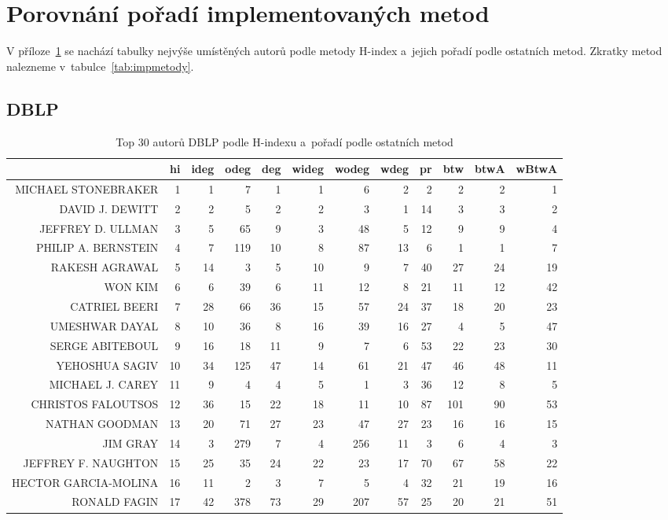 \documentclass{bakalarka}
\begin{document}
\newpage
\chapter{Porovnání pořadí implementovaných metod}
\label{chapter:porovnani}
V příloze~\ref{chapter:porovnani} se nachází tabulky nejvýše umístěných autorů
podle metody H-index a~jejich pořadí podle ostatních metod. Zkratky metod
nalezneme v~tabulce~\ref{tab:impmetody}.
\section{DBLP}

\begin{table}[!ht]
\centering
\caption{Top 30 autorů DBLP podle H-indexu a~pořadí podle ostatních metod}
\label{tab:ranks1}
\begin{sideways}
\begin{scriptsize}
\begin{tabular}{r|r|rrrrrrrrrr}
\toprule
&hi&ideg&odeg&deg&wideg&wodeg&wdeg&pr&btw&btwA&wBtwA\\
\midrule
MICHAEL STONEBRAKER&1&1&7&1&1&6&2&2&2&2&1\\
DAVID J. DEWITT&2&2&5&2&2&3&1&14&3&3&2\\
JEFFREY D. ULLMAN&3&5&65&9&3&48&5&12&9&9&4\\
PHILIP A. BERNSTEIN&4&7&119&10&8&87&13&6&1&1&7\\
RAKESH AGRAWAL&5&14&3&5&10&9&7&40&27&24&19\\
WON KIM&6&6&39&6&11&12&8&21&11&12&42\\
CATRIEL BEERI&7&28&66&36&15&57&24&37&18&20&23\\
UMESHWAR DAYAL&8&10&36&8&16&39&16&27&4&5&47\\
SERGE ABITEBOUL&9&16&18&11&9&7&6&53&22&23&30\\
YEHOSHUA SAGIV&10&34&125&47&14&61&21&47&46&48&11\\
MICHAEL J. CAREY&11&9&4&4&5&1&3&36&12&8&5\\
CHRISTOS FALOUTSOS&12&36&15&22&18&11&10&87&101&90&53\\
NATHAN GOODMAN&13&20&71&27&23&47&27&23&16&16&15\\
JIM GRAY&14&3&279&7&4&256&11&3&6&4&3\\
JEFFREY F. NAUGHTON&15&25&35&24&22&23&17&70&67&58&22\\
HECTOR GARCIA-MOLINA&16&11&2&3&7&5&4&32&21&19&16\\
RONALD FAGIN&17&42&378&73&29&207&57&25&20&21&51\\

\end{tabular}
\end{scriptsize}
\end{sideways}
\end{table}
\end{document}
